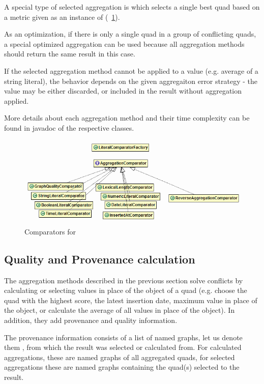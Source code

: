 A special type of selected aggregation is  which selects a single best quad based on a metric given as an instance of  (\figurename~\ref{fig:crComparators}).

As an optimization, if there is only a single quad in a group of conflicting quads, a special optimized  aggregation can be used because all aggregation methods should return the same result in this case.

If the selected aggregation method cannot be applied to a value (e.g. average of a string literal), the behavior depends on the given aggregaiton error strategy - the value may be either discarded, or included in the result without aggregation applied.

More details about each aggregation method and their time complexity can be found in javadoc of the respective classes.

\begin{figure}[htb]
    \centering
    \includegraphics[width=\textwidth]{images/dia-cr-comparators.png}
    \caption{Comparators for }
	\label{fig:crComparators}
\end{figure}
	
\subsection{Quality and Provenance calculation}
The aggregation methods described in the previous section solve conflicts by calculating or selecting values in place of the object of a quad (e.g. choose the quad with the highest \QA score, the latest insertion date, maximum value in place of the object, or calculate the average of all values in place of the object). In addition, they add provenance and quality information.

The provenance information consists of a list of named graphs, let us denote them , from which the result was selected or calculated from. For calculated aggregations, these are named graphs of all aggregated quads, for selected aggregations these are named graphs containing the quad(s) selected to the result.

